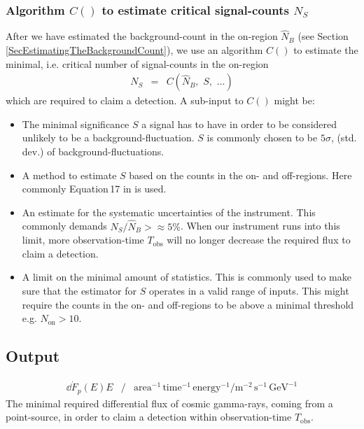 \documentclass{article}%
\begin{document}
\subsubsection*{Algorithm $C()$ to estimate critical signal-counts $N_S$}
%
After we have estimated the background-count in the on-region $\hat{N}_B$ (see Section \ref{SecEstimatingTheBackgroundCount}), we use an algorithm $C()$ to estimate the minimal, i.e. critical number of signal-counts in the on-region
%
\begin{eqnarray*}
N_S &=& C(\hat{N}_B,\,\,S,\,\,\dots)
\end{eqnarray*}
%
which are required to claim a detection.
%
A sub-input to $C()$ might be:
%
\begin{itemize}
\item{} The minimal significance $S$ a signal has to have in order to be considered unlikely to be a background-fluctuation.
%
$S$ is commonly chosen to be $5\sigma$, (std.\,dev.) of background-fluctuations.
%
\item{} A method to estimate $S$ based on the counts in the on- and off-regions. Here commonly Equation\,17 in \cite{li1983analysis} is used.
%
\item{} An estimate for the systematic uncertainties of the instrument. This commonly demands $N_S/\hat{N}_B >\approx 5\%$.
%
When our instrument runs into this limit, more observation-time $T_\text{obs}$ will no longer decrease the required flux to claim a detection.
%
\item{}
A limit on the minimal amount of statistics. This is commonly used to make sure that the estimator for $S$ operates in a valid range of inputs.
%
This might require the counts in the on- and off-regions to be above a minimal threshold e.g. $N_\text{on} > 10$.
%
\end{itemize}
%
\subsection{Output}
%
\begin{eqnarray*}
\dd{\dot{F}_p(E)}{E} &/&
\text{area}^{-1}\,\text{time}^{-1}\,\text{energy}^{-1} /
\text{m}^{-2}\,\text{s}^{-1}\,\text{GeV}^{-1}
\end{eqnarray*}
%
The minimal required differential flux of cosmic gamma-rays, coming from a point-source, in order to claim a detection within observation-time $T_\text{obs}$.
%
\end{document}
